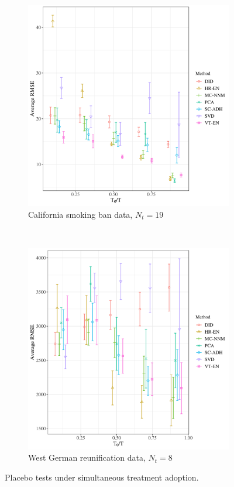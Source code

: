 \documentclass[12pt]{article}
\begin{document}
\begin{figure}[htbp]
\begin{subfigure}[t]{0.48\textwidth}
		\includegraphics[width=\textwidth]{plots/california_N_38_T_31_numruns_20_num_treated_19_simultaneuous_1.png}
		\caption{California smoking ban data, $N_t = 19$}
	\end{subfigure}
	~
	\begin{subfigure}[t]{0.48\textwidth}
		\centering
		\includegraphics[width=\textwidth]{plots/germany_N_16_T_44_numruns_20_num_treated_8_simultaneuous_1.png}
		\caption{West German reunification data, $N_t = 8$} 
	\end{subfigure}
	\caption{Placebo tests under simultaneous treatment adoption. \label{synth-sim}} 
\end{figure}
\end{document}
